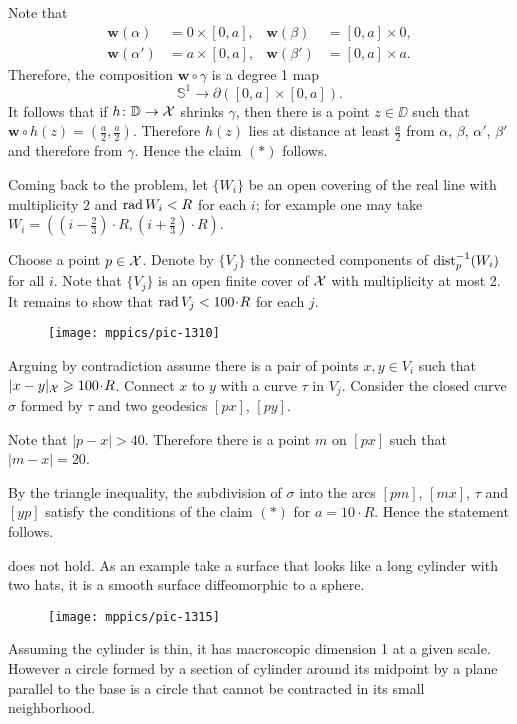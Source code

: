 Note that 
\begin{align*}
\bm{w}(\alpha)&=0\times [0,a],
&
\bm{w}(\beta)&=[0,a]\times 0,
\\
\bm{w}(\alpha')&=a\times [0,a],
&
\bm{w}(\beta')&=[0,a]\times a.
\end{align*} 
Therefore, the composition $\bm{w}\circ\gamma$ is a degree 1 map 
\[\mathbb{S}^1\to \partial([0,a]\times[0,a]).\] 
It follows that if $h\colon\mathbb{D}\to \mathcal{X}$ shrinks $\gamma$, then there is a point $z\in\DD$ such that 
$\bm{w}\circ h(z)=(\tfrac a2,\tfrac a2)$.
Therefore $h(z)$ lies at distance at least $\tfrac a2$ from $\alpha$, $\beta$, $\alpha'$, $\beta'$
and therefore from $\gamma$.
Hence the claim $({*})$ follows.

\medskip

Coming back to the problem, let $\{W_i\}$ be an open covering of the real line with multiplicity $2$ and $\mathop{\rm rad}\nolimits W_i<R$ for each $i$;
for example one may take $W_i=((i-\tfrac23)\cdot R,(i+\tfrac23)\cdot R)$.

Choose a point $p\in \mathcal{X}$.
Denote by $\{V_j\}$ the connected components of $\mathrm{dist}_p^{-1}(W_i)$ for all $i$.
Note that $\{V_j\}$ is an open finite cover of $\mathcal{X}$ with multiplicity at most 2.
It remains to show that $\rad V_j<100\cdot R$ for each $j$.

\begin{wrapfigure}{o}{31 mm}
\vskip-2mm
\centering
\texttt{[image: mppics/pic-1310]}
\end{wrapfigure}

Arguing by contradiction assume there is a pair of points  $x,y\in V_i$ 
such that $|x\z-y|_{\spc{X}}\ge 100\cdot R$.
Connect $x$ to $y$ with a curve $\tau$ in $V_j$.
Consider the closed curve $\sigma$ formed by $\tau$ and two geodesics $[px]$, $[py]$.


Note that $|p-x|>40$.
Therefore there is a point $m$ on $[px]$ such that $|m-x|=20$.

By the triangle inequality, the subdivision of $\sigma$ into the arcs $[pm]$, $[mx]$, $\tau$ and $[yp]$ satisfy the conditions of the claim $({*})$ for $a=10\cdot R$.
Hence the statement follows.

 does not hold.
As an example take a surface that looks like a long cylinder with two hats,
it is a smooth surface diffeomorphic to a sphere.
\begin{figure}[h!]
\vskip0mm
\centering
\texttt{[image: mppics/pic-1315]}
\end{figure}
Assuming the cylinder is thin, it has macroscopic dimension 1 at a given scale.
However a circle formed by a section of cylinder around its midpoint by a plane parallel to the base is a circle that cannot be contracted in its small neighborhood.

